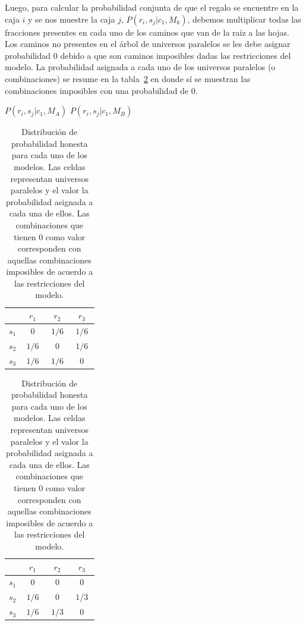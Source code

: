 \documentclass[a4paper,11pt]{book}
\theoremstyle{definition}
\begin{document}
Luego, para calcular la probabilidad conjunta de que el regalo se encuentre en la caja $i$ y se nos muestre la caja $j$, $P(r_i, s_j|c_1,M_k)$, debemos multiplicar todas las fracciones presentes en cada uno de los caminos que van de la ra\'iz a las hojas.
%
Los caminos no presentes en el \'arbol de universos paralelos se les debe asignar probabilidad 0 debido a que son caminos imposibles dadas las restricciones del modelo.
%
La probabilidad asignada a cada uno de los universos paralelos (o combinaciones) se resume en la tabla~\ref{tab:creencia_conjunta} en donde s\'i se muestran las combinaciones imposibles con una probabilidad de 0.
%
\begin{table}[ht!]
\centering
$P(r_i, s_j |c_1, M_A)$ \hspace{3cm} $P(r_i, s_j | c_1, M_B)$ \\[0.1cm]
 \begin{tabular}{|c|c|c|c|} \hline \setlength\tabcolsep{0.4cm}
       & \, $r_1$ \, &  \, $r_2$ \, & \, $r_3$ \, \\ \hline
  $s_1$ & $0$ & $1/6$ & $1/6$  \\ \hline
  $s_2$ & $1/6$ & $0$ & $1/6$  \\ \hline
  $s_3$ & $1/6$ & $1/6$ & $0$ \\ \hline
  \end{tabular}
  \hspace{1.5cm}
  \begin{tabular}{|c|c|c|c|} \hline  \setlength\tabcolsep{0.4cm}
 & \, $r_1$ \, &  \, $r_2$ \, & \, $r_3$ \,  \\ \hline
  $s_1$ & $0$ & $0$ & $0$ \\ \hline
  $s_2$ & $1/6$ & $0$ & $1/3$ \\ \hline
  $s_3$ & $1/6$ & $1/3$ & $0$  \\ \hline
  \end{tabular}
  \caption{Distribuci\'on de probabilidad honesta para cada uno de los modelos. Las celdas representan universos paralelos y el valor la probabilidad asignada a cada una de ellos. Las combinaciones que tienen 0 como valor corresponden con aquellas combinaciones imposibles de acuerdo a las restricciones del modelo.}
  \label{tab:creencia_conjunta}
\end{table}

\end{document}

